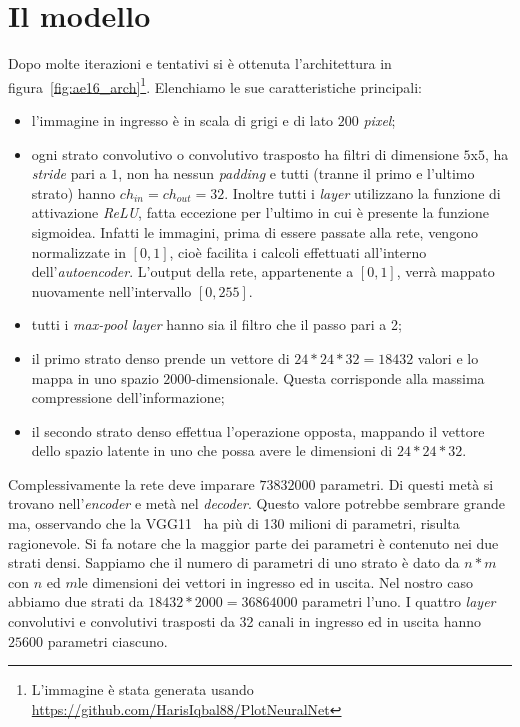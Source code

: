 \section{Il modello}
Dopo molte iterazioni e tentativi si è ottenuta l'architettura in figura~\ref{fig:ae16_arch}\footnote{L'immagine è stata generata usando \url{https://github.com/HarisIqbal88/PlotNeuralNet}}.
Elenchiamo le sue caratteristiche principali:
\begin{itemize}
  \item l'immagine in ingresso è in scala di grigi e di lato $200$ \textit{pixel};

  \item ogni strato convolutivo o convolutivo trasposto ha filtri di dimensione $5$x$5$, ha \textit{stride} pari a $1$, non ha nessun \textit{padding} e tutti (tranne il primo e l'ultimo strato) hanno $ch_{in}=ch_{out}=32$.
    Inoltre tutti i \textit{layer} utilizzano la funzione di attivazione \textit{ReLU}, fatta eccezione per l'ultimo in cui è presente la funzione sigmoidea.
    Infatti le immagini, prima di essere passate alla rete, vengono normalizzate in $[0,1]$, cioè facilita i calcoli effettuati all'interno dell'\textit{autoencoder}.
    L'output della rete, appartenente a $[0,1]$, verrà mappato nuovamente nell'intervallo $[0,255]$.

  \item tutti i \textit{max-pool layer} hanno sia il filtro che il passo pari a 2;

  \item il primo strato denso prende un vettore di $24*24*32=18432$ valori e lo mappa in uno spazio $2000$-dimensionale.
    Questa corrisponde alla massima compressione dell'informazione;

  \item il secondo strato denso effettua l'operazione opposta, mappando il vettore dello spazio latente in uno che possa avere le dimensioni di $24*24*32$.

\end{itemize}
Complessivamente la rete deve imparare  $73 832 000$ parametri.
Di questi metà si trovano nell'\textit{encoder} e metà nel \textit{decoder}.
Questo valore potrebbe sembrare grande ma, osservando che la VGG11~\cite{vgg} ha più di 130 milioni di parametri, risulta ragionevole.
Si fa notare che la maggior parte dei parametri è contenuto nei due strati densi.
Sappiamo che il numero di parametri di uno strato è dato da $n * m$ con $n$ ed $m$le dimensioni dei vettori in ingresso ed in uscita.
Nel nostro caso abbiamo due strati da $18432 * 2000 = 36 864 000$ parametri l'uno.
I quattro \textit{layer} convolutivi e convolutivi trasposti da 32 canali in ingresso ed in uscita hanno $25600$ parametri ciascuno.

